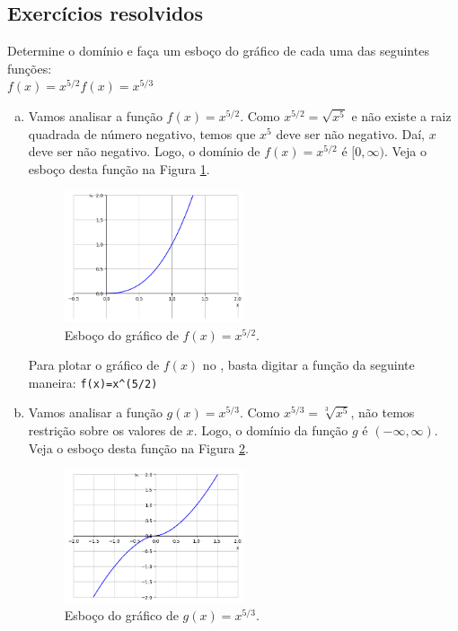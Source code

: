\documentclass[../main.tex]{subfiles}
\begin{document}
\subsection{Exercícios resolvidos}
\begin{exeresol}\label{exeresol:funpot_graf}
  Determine o domínio e faça um esboço do gráfico de cada uma das seguintes funções:\\
$\displaystyle f(x) = x^{5/2}$\hfill  $\displaystyle f(x) = x^{5/3}$\\
\begin{resol}
 \noindent\begin{enumerate}[a)]
  \item Vamos analisar a função $f(x) = x^{5/2}$. Como $x^{5/2} = \sqrt{x^5}$ e não existe a raiz quadrada de número negativo, temos que $x^5$ deve ser não negativo. Daí, $x$ deve ser não negativo. Logo, o domínio de $f(x) = x^{5/2}$ é $[0, \infty)$. Veja o esboço desta função na Figura \ref{fig:exeresol_funpot_graf_a}.

    \begin{figure}[H]
      \centering
      \includegraphics[width=0.5\textwidth]{fig_func/fig_exeresol_funpot_graf_a}
      \caption{Esboço do gráfico de $f(x) = x^{5/2}$.}
      \label{fig:exeresol_funpot_graf_a}
    \end{figure}

    
    Para plotar o gráfico de $f(x)$ no \geogebra, basta digitar a função da seguinte maneira: \verb|f(x)=x^(5/2)|
  \item Vamos analisar a função $g(x) = x^{5/3}$. Como $x^{5/3} = \sqrt[3]{x^5}$, não temos restrição sobre os valores de $x$. Logo, o domínio da função $g$ é $(-\infty, \infty)$. Veja o esboço desta função na Figura \ref{fig:exeresol_funpot_graf_b}.

    \begin{figure}[H]
      \centering
      \includegraphics[width=0.5\textwidth]{fig_func/fig_exeresol_funpot_graf_b}
      \caption{Esboço do gráfico de $g(x) = x^{5/3}$.}
      \label{fig:exeresol_funpot_graf_b}
    \end{figure}



\end{enumerate}
\end{resol}
\end{exeresol}
\end{document}
